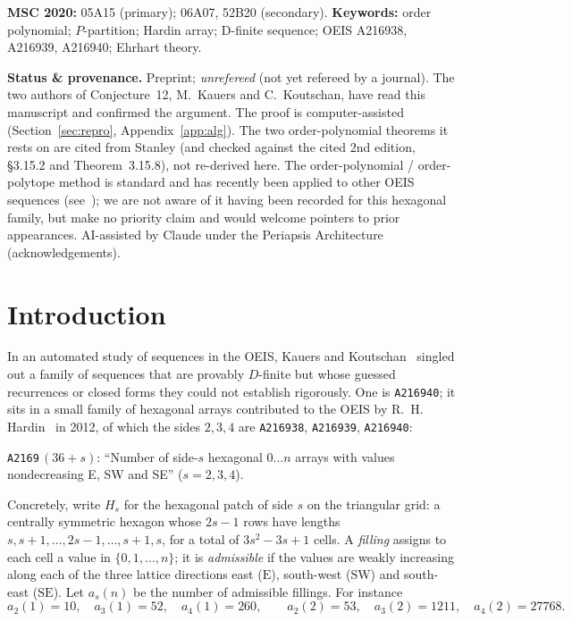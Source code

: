\documentclass[11pt]{article}
\theoremstyle{plain}
\theoremstyle{definition}
\theoremstyle{remark}
\newcommand{\OEIS}[1]{\texttt{#1}}
\newcommand{\Eseq}{\mathrm{E}}
\newcommand{\SW}{\mathrm{SW}}
\newcommand{\SE}{\mathrm{SE}}
\newenvironment{callout}
  {\par\smallskip\noindent\begin{center}\begin{minipage}{0.95\linewidth}%
   \color{periapsisInk}\small\itshape\rule{0pt}{1ex}}
  {\end{minipage}\end{center}\smallskip}
\begin{document}
\begin{center}\small\color{periapsisMuted}
\textbf{MSC 2020:} 05A15 (primary); 06A07, 52B20 (secondary).\quad
\textbf{Keywords:} order polynomial; $P$-partition; Hardin array; D-finite sequence;
OEIS A216938, A216939, A216940; Ehrhart theory.
\end{center}

\vspace{4pt}
\noindent\colorbox{black!3}{\parbox{\dimexpr\linewidth-2\fboxsep\relax}{\small
\textbf{Status \& provenance.} Preprint; \emph{unrefereed} (not yet refereed by a journal). The
two authors of Conjecture~12, M.~Kauers and C.~Koutschan, have read this manuscript and confirmed
the argument. The proof is computer-assisted
(Section~\ref{sec:repro}, Appendix~\ref{app:alg}). The two order-polynomial theorems it rests on are
cited from Stanley (and checked against the cited 2nd edition, \S3.15.2 and Theorem~3.15.8), not
re-derived here. The order-polynomial / order-polytope method is standard and
has recently been applied to other OEIS sequences (see~\cite{EOP24}); we are not aware of it having
been recorded for this hexagonal family, but make no priority claim and would welcome pointers to
prior appearances. AI-assisted by Claude under the Periapsis Architecture (acknowledgements).}}

\section{Introduction}

In an automated study of sequences in the OEIS, Kauers and Koutschan~\cite{KK23} singled out a
family of sequences that are provably $D$-finite but whose guessed recurrences or closed forms they
could not establish rigorously. One is \OEIS{A216940}; it sits in a small family of hexagonal arrays
contributed to the OEIS by R.~H. Hardin~\cite{OEIS} in 2012, of which the sides $2,3,4$ are
\OEIS{A216938}, \OEIS{A216939}, \OEIS{A216940}:

\begin{callout}
\OEIS{A2169}$\,(36{+}s)$: ``Number of side-$s$ hexagonal $0\dots n$ arrays with values nondecreasing
E, SW and SE'' \quad($s=2,3,4$).
\end{callout}

Concretely, write $H_s$ for the hexagonal patch of side $s$ on the triangular grid: a centrally
symmetric hexagon whose $2s-1$ rows have lengths $s,s{+}1,\dots,2s{-}1,\dots,s{+}1,s$, for a total of
$3s^2-3s+1$ cells. A \emph{filling} assigns to each cell a value in $\{0,1,\dots,n\}$; it is
\emph{admissible} if the values are weakly increasing along each of the three lattice directions
east ($\Eseq$), south-west ($\SW$) and south-east ($\SE$). Let $a_s(n)$ be the number of admissible
fillings. For instance
\[
  a_2(1)=10,\quad a_3(1)=52,\quad a_4(1)=260,\qquad
  a_2(2)=53,\quad a_3(2)=1211,\quad a_4(2)=27768 .
\]
\end{document}
